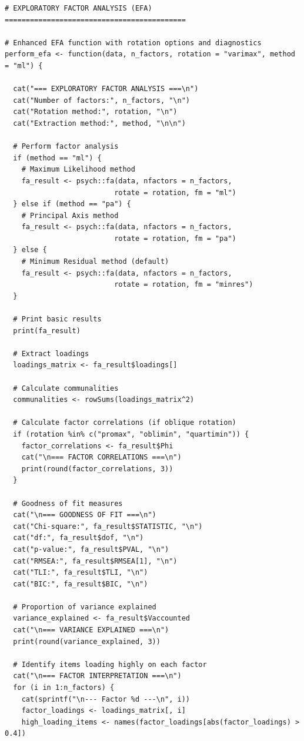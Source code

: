 \begin{lstlisting}
# EXPLORATORY FACTOR ANALYSIS (EFA) ===========================================

# Enhanced EFA function with rotation options and diagnostics
perform_efa <- function(data, n_factors, rotation = "varimax", method = "ml") {
  
  cat("=== EXPLORATORY FACTOR ANALYSIS ===\n")
  cat("Number of factors:", n_factors, "\n")
  cat("Rotation method:", rotation, "\n")
  cat("Extraction method:", method, "\n\n")
  
  # Perform factor analysis
  if (method == "ml") {
    # Maximum Likelihood method
    fa_result <- psych::fa(data, nfactors = n_factors, 
                          rotate = rotation, fm = "ml")
  } else if (method == "pa") {
    # Principal Axis method
    fa_result <- psych::fa(data, nfactors = n_factors, 
                          rotate = rotation, fm = "pa")
  } else {
    # Minimum Residual method (default)
    fa_result <- psych::fa(data, nfactors = n_factors, 
                          rotate = rotation, fm = "minres")
  }
  
  # Print basic results
  print(fa_result)
  
  # Extract loadings
  loadings_matrix <- fa_result$loadings[]
  
  # Calculate communalities
  communalities <- rowSums(loadings_matrix^2)
  
  # Calculate factor correlations (if oblique rotation)
  if (rotation %in% c("promax", "oblimin", "quartimin")) {
    factor_correlations <- fa_result$Phi
    cat("\n=== FACTOR CORRELATIONS ===\n")
    print(round(factor_correlations, 3))
  }
  
  # Goodness of fit measures
  cat("\n=== GOODNESS OF FIT ===\n")
  cat("Chi-square:", fa_result$STATISTIC, "\n")
  cat("df:", fa_result$dof, "\n")
  cat("p-value:", fa_result$PVAL, "\n")
  cat("RMSEA:", fa_result$RMSEA[1], "\n")
  cat("TLI:", fa_result$TLI, "\n")
  cat("BIC:", fa_result$BIC, "\n")
  
  # Proportion of variance explained
  variance_explained <- fa_result$Vaccounted
  cat("\n=== VARIANCE EXPLAINED ===\n")
  print(round(variance_explained, 3))
  
  # Identify items loading highly on each factor
  cat("\n=== FACTOR INTERPRETATION ===\n")
  for (i in 1:n_factors) {
    cat(sprintf("\n--- Factor %d ---\n", i))
    factor_loadings <- loadings_matrix[, i]
    high_loading_items <- names(factor_loadings[abs(factor_loadings) > 0.4])
    

\end{lstlisting}
